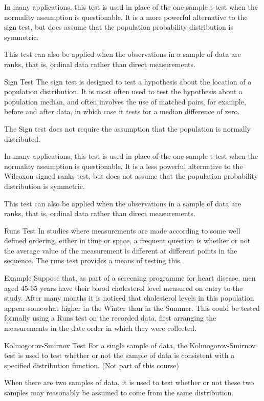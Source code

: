 In many applications, this test is used in place of the one sample t-test when the normality assumption is questionable. It is a more powerful alternative to the sign test, but does assume that the population probability distribution is symmetric.

This test can also be applied when the observations in a sample of data are ranks, that is, ordinal data rather than direct measurements.

Sign Test
The sign test is designed to test a hypothesis about the location of a population distribution. It is most often used to test the hypothesis about a population median, and often involves the use of matched pairs, for example, before and after data, in which case it tests for a median difference of zero.

The Sign test does not require the assumption that the population is normally distributed.

In many applications, this test is used in place of the one sample t-test when the normality assumption is questionable. It is a less powerful alternative to the Wilcoxon signed ranks test, but does not assume that the population probability distribution is symmetric.

This test can also be applied when the observations in a sample of data are ranks, that is, ordinal data rather than direct measurements.

Runs Test
In studies where measurements are made according to some well defined ordering, either in time or space, a frequent question is whether or not the average value of the measurement is different at different points in the sequence. The runs test provides a means of testing this.




Example 
Suppose that, as part of a screening programme for heart disease, men aged 45-65 years have their blood cholesterol level measured on entry to the study. After many months it is noticed that cholesterol levels in this population appear somewhat higher in the Winter than in the Summer. This could be tested formally using a Runs test on the recorded data, first arranging the measurements in the date order in which they were collected.

 Kolmogorov-Smirnov Test
For a single sample of data, the Kolmogorov-Smirnov test is used to test whether or not the sample of data is consistent with a specified distribution function.  (Not part of this course)

When there are two samples of data, it is used to test whether or not these two samples may reasonably be assumed to come from the same distribution. 

